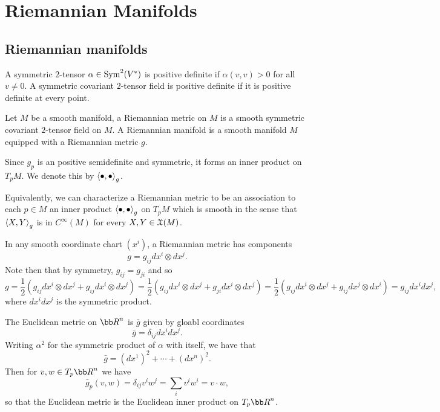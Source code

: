 \section{Riemannian Manifolds}

\subsection{Riemannian manifolds}

A symmetric $2$-tensor $\alpha\in{\rm Sym}^2(V^*)$ is {\emphcolor positive definite} if $\alpha(v,v)>0$ for all $v\neq0$.
A symmetric covariant $2$-tensor field is positive definite if it is positive definite at every point.

\bdefn

    Let $M$ be a smooth manifold, a {\emphcolor Riemannian metric} on $M$ is a smooth symmetric covariant $2$-tensor field on $M$.
    A {\emphcolor Riemannian manifold} is a smooth manifold $M$ equipped with a Riemannian metric $g$.

\edefn

Since $g_p$ is an positive semidefinite and symmetric, it forms an inner product on $T_pM$.
We denote this by $\mathopen{}\mathclose{\left<\bullet,\bullet\right>}_g$.

\bnote

    Equivalently, we can characterize a Riemannian metric to be an association to each $p\in M$ an inner product $\mathopen{}\mathclose{\left<\bullet,\bullet\right>}_g$ on $T_pM$
    which is smooth in the sense that $\mathopen{}\mathclose{\left<X,Y\right>}_g$ is in $C^\infty(M)$ for every $X,Y\in{\frak X}(M)$.

\enote

In any smooth coordinate chart $(x^i)$, a Riemannian metric has components
$$ g = g_{ij}dx^i\otimes dx^j . $$
Note then that by symmetry, $g_{ij}=g_{ji}$ and so
$$ g = \frac12(g_{ij}dx^i\otimes dx^j + g_{ij}dx^i\otimes dx^j) = \frac12(g_{ij}dx^i\otimes dx^j + g_{ji}dx^i\otimes dx^j) =
\frac12(g_{ij}dx^i\otimes dx^j + g_{ij}dx^j\otimes dx^i) = g_{ij}dx^idx^j , $$
where $dx^idx^j$ is the symmetric product.

\bexam

    The {\emphcolor Euclidean metric} on $\bR^n$ is $\bar g$ given by gloabl coordinates
    $$ \bar g = \delta_{ij}dx^idx^j . $$
    Writing $\alpha^2$ for the symmetric product of $\alpha$ with itself, we have that
    $$ \bar g = (dx^1)^2 + \cdots + (dx^n)^2 . $$
    Then for $v,w\in T_p\bR^n$ we have
    $$ \bar g_p(v,w) = \delta_{ij}v^iw^j = \sum_i v^iw^i = v\cdot w, $$
    so that the Euclidean metric is the Euclidean inner product on $T_p\bR^n$.

